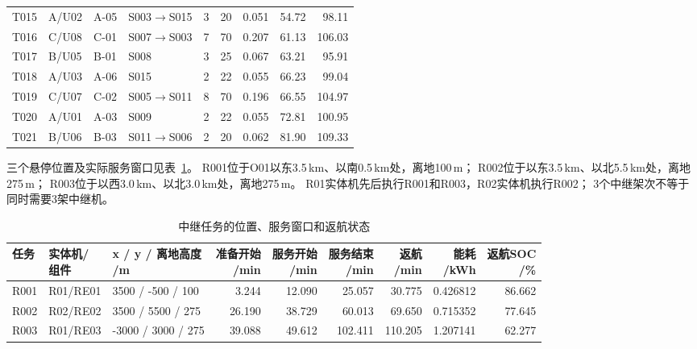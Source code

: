 \begin{table}[!htbp]
\begin{tabular}{@{}lll lrrrrr@{}}
T015 & A/U02 & A-05 & S003$\to$S015 & 3 & 20 & 0.051 & 54.72 & 98.11 \\
T016 & C/U08 & C-01 & S007$\to$S003 & 7 & 70 & 0.207 & 61.13 & 106.03 \\
T017 & B/U05 & B-01 & S008 & 3 & 25 & 0.067 & 63.21 & 95.91 \\
T018 & A/U03 & A-06 & S015 & 2 & 22 & 0.055 & 66.23 & 99.04 \\
T019 & C/U07 & C-02 & S005$\to$S011 & 8 & 70 & 0.196 & 66.55 & 104.97 \\
T020 & A/U01 & A-03 & S009 & 2 & 22 & 0.055 & 72.81 & 100.95 \\
T021 & B/U06 & B-03 & S011$\to$S006 & 2 & 20 & 0.062 & 81.90 & 109.33 \\
\bottomrule
\end{tabular}
\end{table}


三个悬停位置及实际服务窗口见表~\ref{tab:q3-relays}。
R001位于O01以东3.5\,km、以南0.5\,km处，离地100\,m；
R002位于以东3.5\,km、以北5.5\,km处，离地275\,m；
R003位于以西3.0\,km、以北3.0\,km处，离地275\,m。
R01实体机先后执行R001和R003，R02实体机执行R002；
3个中继架次不等于同时需要3架中继机。
\begin{table}[!htbp]
\centering
\footnotesize
\setlength{\tabcolsep}{3pt}
\renewcommand{\arraystretch}{1.10}
\caption{中继任务的位置、服务窗口和返航状态}\label{tab:q3-relays}
\begin{tabular}{@{}lllrrrrrr@{}}
\toprule
任务 & \shortstack{实体机/\\组件} & \shortstack{x / y / 离地高度\\/m} & \shortstack{准备开始\\/min} & \shortstack{服务开始\\/min} & \shortstack{服务结束\\/min} & \shortstack{返航\\/min} & \shortstack{能耗\\/kWh} & \shortstack{返航SOC\\/\%} \\
\midrule
R001 & R01/RE01 & 3500 / -500 / 100 & 3.244 & 12.090 & 25.057 & 30.775 & 0.426812 & 86.662 \\
R002 & R02/RE02 & 3500 / 5500 / 275 & 26.190 & 38.729 & 60.013 & 69.650 & 0.715352 & 77.645 \\
R003 & R01/RE03 & -3000 / 3000 / 275 & 39.088 & 49.612 & 102.411 & 110.205 & 1.207141 & 62.277 \\
\bottomrule
\end{tabular}
\end{table}


